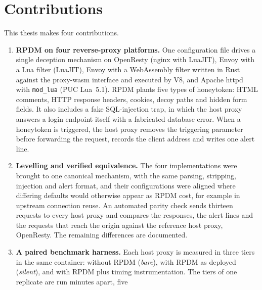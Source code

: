 \documentclass{rptuma}
\begin{document}
\iffalse
\section{Contributions}
\label{sec:intro.contrib}

This thesis makes four contributions.

\begin{enumerate}
  \item \textbf{RPDM on four reverse-proxy platforms.} One configuration file drives a single deception mechanism
    on OpenResty (nginx with LuaJIT), Envoy with a Lua filter (LuaJIT), Envoy with a WebAssembly
    filter written in Rust against the proxy-wasm interface and executed by V8, and Apache httpd
    with \texttt{mod\_lua} (PUC Lua~5.1). RPDM plants five types of honeytoken: HTML comments,
    HTTP response headers, cookies, decoy paths and hidden form fields. It also includes a fake
    SQL-injection trap, in which the host proxy answers a login endpoint itself with a fabricated
    database error. When a honeytoken is triggered, the host proxy removes the triggering parameter
    before forwarding the request, records the client address and writes one alert line.
  \item \textbf{Levelling and verified equivalence.} The four implementations were brought to
    one canonical mechanism, with the same parsing, stripping, injection and alert format, and
    their configurations were aligned where differing defaults would otherwise appear as RPDM
    cost, for example in upstream connection reuse. An automated parity check sends thirteen
    requests to every host proxy and compares the responses, the alert lines and the requests that
    reach the origin against the reference host proxy, OpenResty. The remaining differences are
    documented.
  \item \textbf{A paired benchmark harness.} Each host proxy is measured in three tiers in the same
    container: without RPDM (\emph{bare}), with RPDM as deployed (\emph{silent}), and with RPDM
    plus timing instrumentation. The tiers of one replicate are run minutes apart, five

\end{enumerate}
\end{document}
